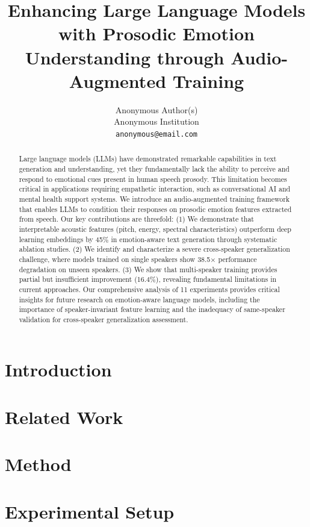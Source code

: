 \documentclass[11pt]{article}
\title{\textbf{Enhancing Large Language Models with Prosodic Emotion Understanding through Audio-Augmented Training}}
\author{
    Anonymous Author(s) \\
    Anonymous Institution \\
    \texttt{anonymous@email.com}
}
\date{}
\begin{document}
\maketitle

\begin{abstract}
Large language models (LLMs) have demonstrated remarkable capabilities in text generation and understanding, yet they fundamentally lack the ability to perceive and respond to emotional cues present in human speech prosody. This limitation becomes critical in applications requiring empathetic interaction, such as conversational AI and mental health support systems. We introduce an audio-augmented training framework that enables LLMs to condition their responses on prosodic emotion features extracted from speech. Our key contributions are threefold: (1) We demonstrate that interpretable acoustic features (pitch, energy, spectral characteristics) outperform deep learning embeddings by 45\% in emotion-aware text generation through systematic ablation studies. (2) We identify and characterize a severe cross-speaker generalization challenge, where models trained on single speakers show 38.5× performance degradation on unseen speakers. (3) We show that multi-speaker training provides partial but insufficient improvement (16.4\%), revealing fundamental limitations in current approaches. Our comprehensive analysis of 11 experiments provides critical insights for future research on emotion-aware language models, including the importance of speaker-invariant feature learning and the inadequacy of same-speaker validation for cross-speaker generalization assessment.
\end{abstract}

\section{Introduction}
\label{sec:introduction}


\section{Related Work}
\label{sec:related}


\section{Method}
\label{sec:method}


\section{Experimental Setup}
\label{sec:experiments}

\end{document}
